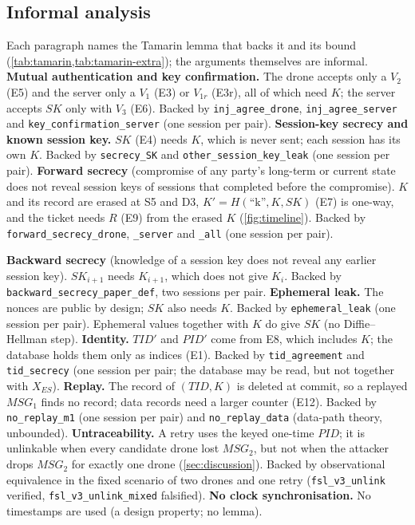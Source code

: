 \subsection{Informal analysis}\label{sec:informal}
Each paragraph names the Tamarin lemma that backs it and its bound (\cref{tab:tamarin,tab:tamarin-extra}); the arguments
themselves are informal.
\textbf{Mutual authentication and key confirmation.} The drone accepts only a $V_2$ (E5) and the server only a $V_1$ (E3) or
$V_{1r}$ (E3r), all of which need $K$; the server accepts $SK$ only with $V_3$ (E6). Backed by \texttt{inj\_agree\_drone},
\texttt{inj\_agree\_server} and \texttt{key\_confirmation\_server} (one session per pair).
\textbf{Session-key secrecy and known session key.} $SK$ (E4) needs $K$, which is never sent; each session has its own $K$.
Backed by \texttt{secrecy\_SK} and \texttt{other\_session\_key\_leak} (one session per pair).
\textbf{Forward secrecy} (compromise of any party's long-term or current state does not reveal session keys of sessions that
completed before the compromise). $K$ and its record are erased at S5 and D3, $K' = H(\text{``k''}, K, SK)$ (E7) is one-way, and
the ticket needs $R$ (E9) from the erased $K$ (\cref{fig:timeline}). Backed by \texttt{forward\_secrecy\_drone},
\texttt{\_server} and \texttt{\_all} (one session per pair).

\textbf{Backward secrecy} (knowledge of a session key does not reveal any earlier session key). $SK_{i+1}$ needs $K_{i+1}$,
which does not give $K_i$. Backed by \texttt{backward\_secrecy\_paper\_def}, two sessions per pair.
\textbf{Ephemeral leak.} The nonces are public by design; $SK$ also needs $K$. Backed by \texttt{ephemeral\_leak} (one session
per pair). Ephemeral values together with $K$ do give $SK$ (no Diffie--Hellman step).
\textbf{Identity.} $TID'$ and $PID'$ come from E8, which includes $K$; the database holds them only as indices (E1). Backed by
\texttt{tid\_agreement} and \texttt{tid\_secrecy} (one session per pair; the database may be read, but not together with
$X_{ES}$).
\textbf{Replay.} The record of $(TID, K)$ is deleted at commit, so a replayed $MSG_1$ finds no record; data records need a
larger counter (E12). Backed by \texttt{no\_replay\_m1} (one session per pair) and \texttt{no\_replay\_data} (data-path theory,
unbounded).
\textbf{Untraceability.} A retry uses the keyed one-time $PID$; it is unlinkable when every candidate drone lost $MSG_2$, but
not when the attacker drops $MSG_2$ for exactly one drone (\cref{sec:discussion}). Backed by observational equivalence in the
fixed scenario of two drones and one retry (\texttt{fsl\_v3\_unlink} verified, \texttt{fsl\_v3\_unlink\_mixed} falsified).
\textbf{No clock synchronisation.} No timestamps are used (a design property; no lemma).

